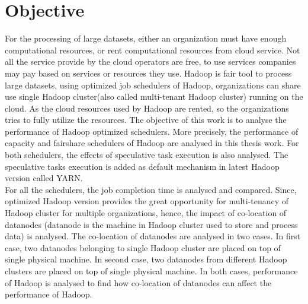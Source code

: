 


\section{Objective}

 For the processing of large datasets, either an organization must have enough computational resources, or rent computational resources from cloud service. Not all the service provide by the cloud operators are free, to use services companies may pay based on services or resources they use. Hadoop is fair tool to process large datasets, using optimized job schedulers of Hadoop, organizations can share use single Hadoop cluster(also called multi-tenant Hadoop cluster) running on the cloud. As the cloud resources used by Hadoop are rented, so the organizations tries to fully utilize the resources. The objective of this work is to analyse the performance of Hadoop optimized schedulers. More precisely, the performance of capacity and fairshare schedulers of Hadoop are analysed in this thesis work. For both schedulers, the effects of speculative task execution is also analysed.  The speculative tasks execution is added as default mechanism in latest Hadoop version called YARN.\\
 
 For all the schedulers, the job completion time is analysed and compared. Since, optimized Hadoop version provides the great opportunity for multi-tenancy of Hadoop cluster for multiple organizations, hence, the impact of co-location of datanodes (datanode is the machine in Hadoop cluster used to store and process data) is analysed. The co-location of datanodes are analysed in two cases. In first case, two datanodes belonging to single Hadoop cluster are placed on top of single physical machine. In second case, two datanodes from different Hadoop clusters are placed on top of single physical machine. In both cases, performance of Hadoop is analysed to find how co-location of datanodes can affect the performance of Hadoop. \\  
 



